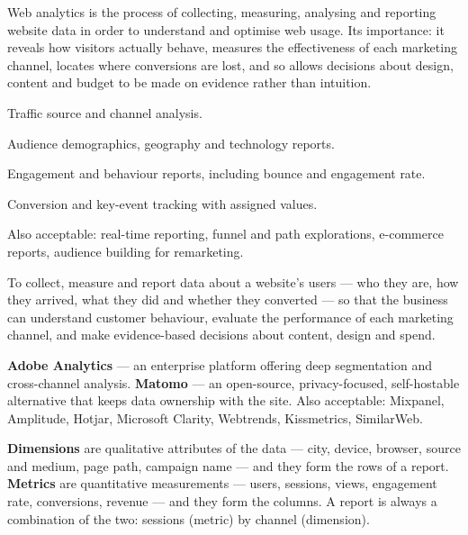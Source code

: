 \begin{qlist}
Web analytics is the process of collecting, measuring, analysing and reporting
website data in order to understand and optimise web usage. Its importance: it
reveals how visitors actually behave, measures the effectiveness of each
marketing channel, locates where conversions are lost, and so allows decisions
about design, content and budget to be made on evidence rather than intuition.

\begin{apts}
\item Traffic source and channel analysis.
\item Audience demographics, geography and technology reports.
\item Engagement and behaviour reports, including bounce and engagement rate.
\item Conversion and key-event tracking with assigned values.
\end{apts}
Also acceptable: real-time reporting, funnel and path explorations, e-commerce
reports, audience building for remarketing.

To collect, measure and report data about a website's users --- who they are,
how they arrived, what they did and whether they converted --- so that the
business can understand customer behaviour, evaluate the performance of each
marketing channel, and make evidence-based decisions about content, design and
spend.

\textbf{Adobe Analytics} --- an enterprise platform offering deep segmentation
and cross-channel analysis. \textbf{Matomo} --- an open-source,
privacy-focused, self-hostable alternative that keeps data ownership with the
site. Also acceptable: Mixpanel, Amplitude, Hotjar, Microsoft Clarity,
Webtrends, Kissmetrics, SimilarWeb.

\textbf{Dimensions} are qualitative attributes of the data --- city, device,
browser, source and medium, page path, campaign name --- and they form the rows
of a report. \textbf{Metrics} are quantitative measurements --- users, sessions,
views, engagement rate, conversions, revenue --- and they form the columns. A
report is always a combination of the two: sessions (metric) by channel
(dimension).


\end{qlist}
